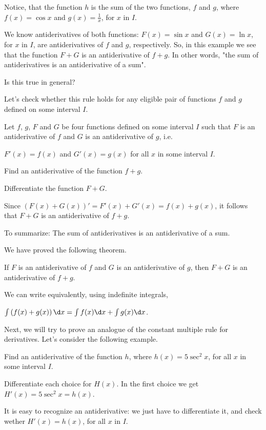 \documentclass{ximera}
\begin{document}
Notice, that the function $h$ is the sum of the two functions, $f$ and $g$, where $f(x)=\cos{x}$ and $g(x)=\frac{1}{x}$, for $x$ in $I$.

We know antiderivatives of both functions:  $F(x)=\sin{x}$ and $G(x)=\ln{x}$,  for $x$ in $I$, are antiderivatives of $f$ and $g$, respectively.
So, in this example we see that the function  $F+G$ is an antiderivative of $f+g$.
In other words, "the sum of antiderivatives is an antiderivative of a sum".

Is this true in general? 

Let's check whether this rule holds for any eligible pair of functions $f$ and $g$ defined on some interval $I$.
 \begin{question}
Let $f$, $g$, $F$ and $G$ be four functions defined on some interval $I$ such that $F$ is an antiderivative of $f$ and $G$ is an antiderivative of $g$, i.e.

$F'(x)=f(x)$ and $G'(x)=g(x)$ for all $x$ in some interval $I$.

  Find an antiderivative of the function $f+g$.
    \begin{hint}
    Differentiate the function $F+G$.
     \end{hint}
     Since
     $\left(F(x)+G(x)\right)'=F'(x)+G'(x)=f(x)+g(x)$,
     it follows that  $F+G$ is an antiderivative of $f+g$. 
     
 To summarize: The sum of antiderivatives is an antiderivative of a sum. 
\end{question}
We have proved the following theorem.

\begin{theorem}\label{theorem:SRA}
If $F$ is an antiderivative of $f$ and $G$ is an antiderivative of
$g$, then $F+G$ is an antiderivative of $f+g$.

We can write equivalently, using indefinite integrals, 

$\int \left(f(x)+g(x)\right) \d x= \int f(x)\d x +\int g(x) \d x$.
\end{theorem}

Next, we will try to prove an analogue of the constant multiple rule for derivatives.
Let's consider the following example.
\begin{example}
  Find  an antiderivative of the function $h$, where
   $h(x)=5\sec^{2}{x}$,  for all $x$ in some interval $I$.
  \begin{multipleChoice}
  \end{multipleChoice}
  \begin{feedback}
    Differentiate each choice for $H(x)$.  In the first choice we get
    $H'(x)=5\sec^{2}{x}=h(x)$.
  \end{feedback}
\end{example}
It is easy to recognize an antiderivative: we just have to differentiate it, and check wether $H'(x)=h(x)$, for all $x$ in $I$.
\end{document}
